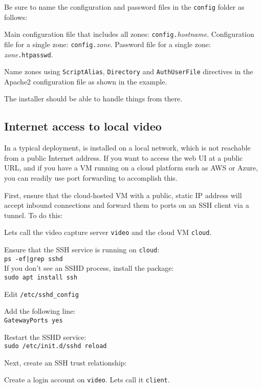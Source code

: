     Be sure to name the configuration and password files in the
    \texttt{config} folder as follows:

    \BI
    \I Main configuration file that includes all zones: \texttt{config.}\emph{hostname}.
    \I Configuration file for a single zone: \texttt{config.}\emph{zone}.
    \I Password file for a single zone: \emph{zone}\texttt{.htpasswd}.
    \EI

    Name zones using \texttt{ScriptAlias}, \texttt{Directory} and
    \texttt{AuthUserFile} directives in the Apache2 configuration file
    as shown in the example.

    The installer should be able to handle things from there.

  \subsection{Internet access to local video}

    In a typical deployment, \PRODUCT{} is installed on a local network,
    which is not reachable from a public Internet address.  If you want
    to access the \PRODUCT{} web UI at a public URL, and if you have a
    VM running on a cloud platform such as AWS or Azure, you can readily
    use port forwarding to accomplish this.

    First, ensure that the cloud-hosted VM with a public, static IP address
    will accept inbound connections and forward them to ports on an SSH
    client via a tunnel.  To do this:

    \BI
    \I Lets call the video capture server \texttt{video} and
       the cloud VM \texttt{cloud}.

    \I Ensure that the SSH service is running on \texttt{cloud}:\\
       \texttt{ps -ef|grep sshd}\\
       If you don't see an SSHD process, install the package:\\
       \texttt{sudo apt install ssh}

    \I Edit \texttt{/etc/sshd\_config}

    \I Add the following line:\\
       \texttt{GatewayPorts yes}

    \I Restart the SSHD service:\\
       \texttt{sudo /etc/init.d/sshd reload}
    \EI

    Next, create an SSH trust relationship:

    \BE
    \I Create a login account on \texttt{video}.  Lets call it
       \texttt{client}.

